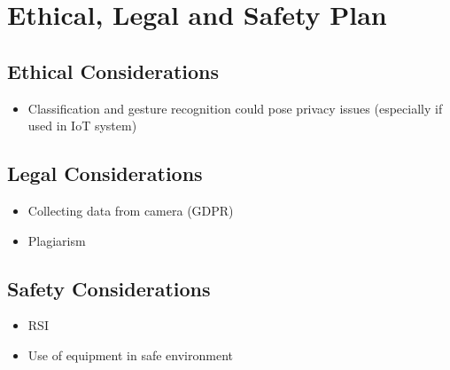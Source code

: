 \chapter{Ethical, Legal and Safety Plan}

\section{Ethical Considerations}

\begin{itemize}
    \item Classification and gesture recognition could pose privacy issues (especially if used in IoT system)
\end{itemize}

\section{Legal Considerations}

\begin{itemize}
    \item Collecting data from camera (GDPR)
    \item Plagiarism
\end{itemize}

\section{Safety Considerations}

\begin{itemize}
    \item RSI
    \item Use of equipment in safe environment
\end{itemize}